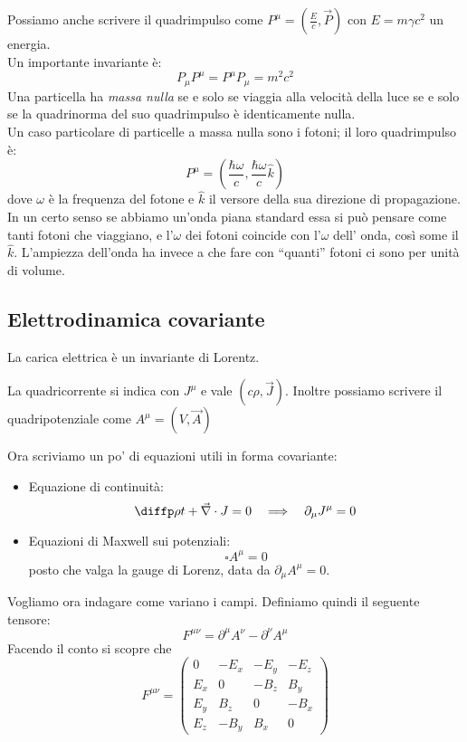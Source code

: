 \documentclass[a4paper,10pt,oneside]{math_article}
\renewcommand{\div}{\vec{\nabla} \cdot}
\newcommand{\dalamb}{\square}
\begin{document}
			Possiamo anche scrivere il quadrimpulso come $P^\mu = (\frac Ec, \vec P)$ con $E=m\gamma c^2$ un energia.\\
			Un importante invariante è:
			\[
				P_\mu P^\mu=P^\mu P_\mu=m^2 c^2
			\]
			Una particella ha {\it massa nulla} se e solo se viaggia alla velocità della luce se e solo se la quadrinorma del suo quadrimpulso è identicamente nulla.\\
			Un caso particolare di particelle a massa nulla sono i fotoni; il loro quadrimpulso è:
			\[	
				P^\mu=\left(\frac{\hbar \omega}{c},\frac{\hbar \omega}{c}\hat k\right)
			\]
			dove $\omega$ è la frequenza del fotone e $\hat k$ il versore della sua direzione di propagazione.
			In un certo senso se abbiamo un'onda piana standard essa si può pensare come tanti fotoni che viaggiano, e l'$\omega$ dei fotoni coincide con l'$\omega$ dell' onda, così some il $\hat k$. L'ampiezza dell'onda ha invece a che fare con ``quanti'' fotoni ci sono per unità di volume.
			
			\subsection{Elettrodinamica covariante}
				La carica elettrica è un invariante di Lorentz.
				
				La quadricorrente si indica con $J^\mu$ e vale $(c\rho,\vec J)$. Inoltre possiamo scrivere il quadripotenziale come $A^\mu= (V,\vec A)$
				
				Ora scriviamo un po' di equazioni utili in forma covariante:
				\begin{itemize}
					\item Equazione di continuità:
						\[
							\diffp \rho t + \div J = 0 \quad\Longrightarrow\quad \partial_\mu J^\mu = 0
						\]
					\item Equazioni di Maxwell sui potenziali:
						\[
							\dalamb A^\mu = 0
						\]
						posto che valga la gauge di Lorenz, data da $\partial_\mu A^\mu =0$.
				\end{itemize}
				
				Vogliamo ora indagare come variano i campi. Definiamo quindi il seguente tensore:
				\[
					F^{\mu\nu} = \partial^\mu A^\nu - \partial^\nu A^\mu
				\]
				Facendo il conto si scopre che 
				\[
					F^{\mu\nu} = \left(
					\begin{array}{c|ccc}
						0		&	-E_x	& -E_y	& -E_z \\
						\hline 
						E_x	&		0		& -B_z	&  B_y \\
						E_y &  B_z	& 	0		&	-B_x \\
						E_z & -B_y	&  B_x 	& 	0
					\end{array}
					\right)
				\]
				
\end{document}

